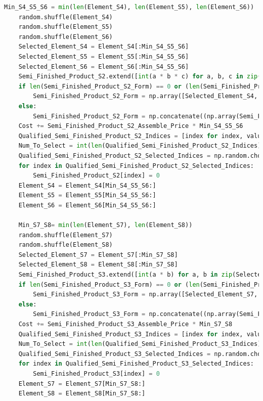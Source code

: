 \documentclass[withoutpreface,bwprint]{cumcmthesis} %
\begin{document}
\begin{appendices}
\begin{lstlisting}[language=python]
    Min_S4_S5_S6 = min(len(Element_S4), len(Element_S5), len(Element_S6))
    random.shuffle(Element_S4)
    random.shuffle(Element_S5)
    random.shuffle(Element_S6)
    Selected_Element_S4 = Element_S4[:Min_S4_S5_S6]
    Selected_Element_S5 = Element_S5[:Min_S4_S5_S6]
    Selected_Element_S6 = Element_S6[:Min_S4_S5_S6]
    Semi_Finished_Product_S2.extend([int(a * b * c) for a, b, c in zip(Selected_Element_S4, Selected_Element_S5, Selected_Element_S6)])
    if len(Semi_Finished_Product_S2_Form) == 0 or (len(Semi_Finished_Product_S2_Form) == 3 and all(len(sublist) == 0 for sublist in Semi_Finished_Product_S2_Form)):
        Semi_Finished_Product_S2_Form = np.array([Selected_Element_S4, Selected_Element_S5, Selected_Element_S6])
    else:
        Semi_Finished_Product_S2_Form = np.concatenate((np.array(Semi_Finished_Product_S2_Form), np.array([Selected_Element_S4, Selected_Element_S5, Selected_Element_S6])), axis=1)
    Cost += Semi_Finished_Product_S2_Assemble_Price * Min_S4_S5_S6
    Qualified_Semi_Finished_Product_S2_Indices = [index for index, value in enumerate(Semi_Finished_Product_S2) if value == 1]
    Num_To_Select = int(len(Qualified_Semi_Finished_Product_S2_Indices) * Semi_Finished_Product_S2_Defect_Rate)
    Qualified_Semi_Finished_Product_S2_Selected_Indices = np.random.choice(Qualified_Semi_Finished_Product_S2_Indices, size=Num_To_Select, replace=False)
    for index in Qualified_Semi_Finished_Product_S2_Selected_Indices:
        Semi_Finished_Product_S2[index] = 0
    Element_S4 = Element_S4[Min_S4_S5_S6:]
    Element_S5 = Element_S5[Min_S4_S5_S6:]
    Element_S6 = Element_S6[Min_S4_S5_S6:]

    Min_S7_S8= min(len(Element_S7), len(Element_S8))
    random.shuffle(Element_S7)
    random.shuffle(Element_S8)
    Selected_Element_S7 = Element_S7[:Min_S7_S8]
    Selected_Element_S8 = Element_S8[:Min_S7_S8]
    Semi_Finished_Product_S3.extend([int(a * b) for a, b in zip(Selected_Element_S7, Selected_Element_S8)])
    if len(Semi_Finished_Product_S3_Form) == 0 or (len(Semi_Finished_Product_S3_Form) == 2 and all(len(sublist) == 0 for sublist in Semi_Finished_Product_S3_Form)):
        Semi_Finished_Product_S3_Form = np.array([Selected_Element_S7, Selected_Element_S8])
    else:
        Semi_Finished_Product_S3_Form = np.concatenate((np.array(Semi_Finished_Product_S3_Form), np.array([Selected_Element_S7, Selected_Element_S8])), axis=1)
    Cost += Semi_Finished_Product_S3_Assemble_Price * Min_S7_S8
    Qualified_Semi_Finished_Product_S3_Indices = [index for index, value in enumerate(Semi_Finished_Product_S3) if value == 1]
    Num_To_Select = int(len(Qualified_Semi_Finished_Product_S3_Indices) * Semi_Finished_Product_S3_Defect_Rate)
    Qualified_Semi_Finished_Product_S3_Selected_Indices = np.random.choice(Qualified_Semi_Finished_Product_S3_Indices, size=Num_To_Select, replace=False)
    for index in Qualified_Semi_Finished_Product_S3_Selected_Indices:
        Semi_Finished_Product_S3[index] = 0
    Element_S7 = Element_S7[Min_S7_S8:]
    Element_S8 = Element_S8[Min_S7_S8:]


\end{lstlisting}
\end{appendices}
\end{document}
